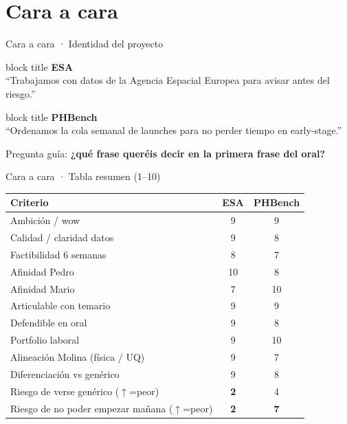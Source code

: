 \documentclass[aspectratio=169,10pt]{beamer}
\begin{document}
\section{Cara a cara}

\begin{frame}{Cara a cara · Identidad del proyecto}
  \noindent
  \begin{minipage}[t]{0.48\textwidth}
    \begin{beamercolorbox}[wd=\textwidth,rounded=true,sep=8pt,center]{block title}
      \textbf{ESA}\\[0.35em]
      {\scriptsize\normalfont ``Trabajamos con datos de la Agencia Espacial Europea para avisar antes del riesgo.''}
    \end{beamercolorbox}
  \end{minipage}\hfill
  \begin{minipage}[t]{0.48\textwidth}
    \begin{beamercolorbox}[wd=\textwidth,rounded=true,sep=8pt,center]{block title}
      \textbf{PHBench}\\[0.35em]
      {\scriptsize\normalfont ``Ordenamos la cola semanal de launches para no perder tiempo en early-stage.''}
    \end{beamercolorbox}
  \end{minipage}
  \vspace{0.55em}
  Pregunta guía: \textbf{¿qué frase queréis decir en la primera frase del oral?}
\end{frame}

\begin{frame}{Cara a cara · Tabla resumen (1--10)}
  \tiny
  \renewcommand{\arraystretch}{1.2}
  \begin{tabular}{@{}lcc@{}}
    \toprule
    Criterio & ESA & PHBench \\
    \midrule
    Ambición / wow & 9 & 9 \\
    Calidad / claridad datos & 9 & 8 \\
    Factibilidad 6 semanas & 8 & 7 \\
    Afinidad Pedro & 10 & 8 \\
    Afinidad Mario & 7 & 10 \\
    Articulable con temario & 9 & 9 \\
    Defendible en oral & 9 & 8 \\
    Portfolio laboral & 9 & 10 \\
    Alineación Molina (física / UQ) & 9 & 7 \\
    Diferenciación vs genérico & 9 & 8 \\
    Riesgo de verse genérico ($\uparrow$=peor) & \textbf{2} & 4 \\
    Riesgo de no poder empezar mañana ($\uparrow$=peor) & \textbf{2} & \textbf{7} \\
    \bottomrule
  \end{tabular}
\end{frame}
\end{document}
